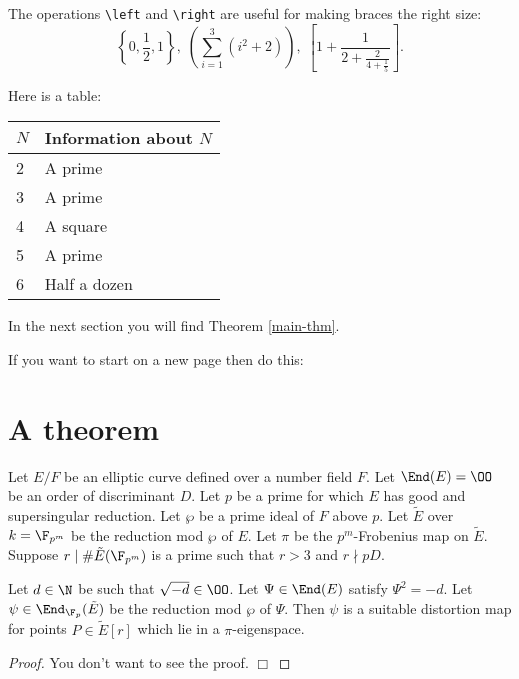 
The operations \verb|\left| and \verb|\right| are useful for making
braces the right size:
\[
   \left\{ 0, \frac{1}{2}, 1 \right\}, \;
   \left( \sum_{i=1}^3 (i^2 + 2) \right), \;
   \left[ 1 + \frac{1}{2 + \frac{2}{4 + \frac{1}{5}}} \right].
\]

Here is a table:

\vskip 0.2cm

\begin{center}
\begin{tabular}{|l|l|}
  \hline
  $N$ & Information about $N$ \\
 \hline
  2 & A prime \\
  3 & A prime \\
  4 & A square \\
  5 & A prime \\
  6 & Half a dozen \\
  \hline
\end{tabular}
\end{center}

\vskip 0.2cm

In the next section you will find Theorem \ref{main-thm}.

If you want to start on a new page then do this:

\newpage

\section{A theorem}

\begin{theorem}
\label{main-thm}
Let $E/F$ be an elliptic curve defined over a number field $F$.
Let $\End(E) = \OO$ be an order of discriminant $D$.
Let $p$ be a prime for which $E$ has good and supersingular reduction.
Let $\wp $ be a prime ideal of $F$ above $p$. Let $\tilde E$ 
over $k=\F_{p^m}$ be the reduction mod $\wp $ of $E$.
Let $\pi$ be the $p^m$-Frobenius map on $\tilde{E}$.
Suppose $r \mid \# \tilde{E}( \F_{p^m} )$ is a prime
such that $r > 3$ and $r \nmid pD$.

Let $d\in \N$ be such that $\sqrt{-d} \in \OO$.
Let $\Psi \in \End (E)$ satisfy  $\Psi^2=-d$.
Let $\psi \in \End_{\F_p}(\tilde E)$ be the 
reduction mod $\wp$ of $\Psi$.
Then $\psi$ is a suitable distortion map for points $P \in \tilde{E}[r]$
which lie in a $\pi$-eigenspace.
\end{theorem}


\begin{proof} 
You don't want to see the proof. \hfill $\Box$
\end{proof}


